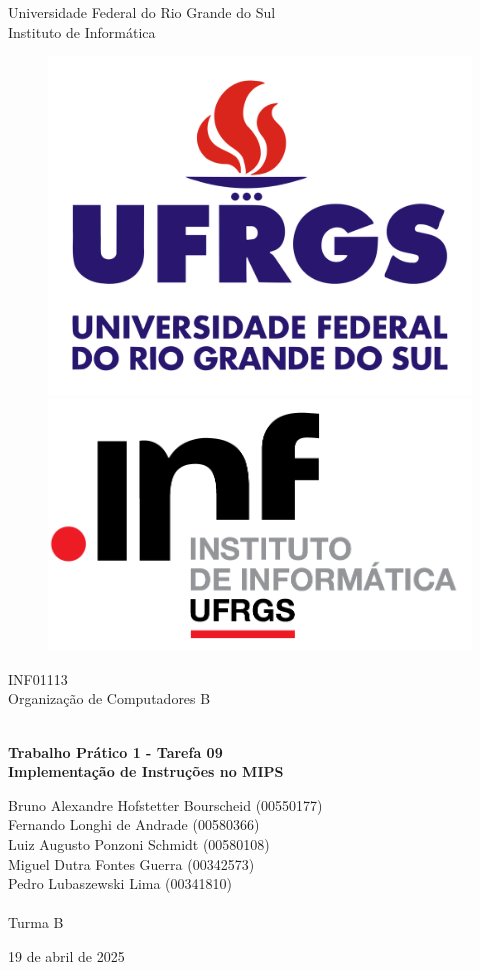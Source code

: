 \documentclass{report}
\begin{document}
    \begin{titlepage}
        \centering
        
        \LARGE {Universidade Federal do Rio Grande do Sul \\ Instituto de Informática}
    
        \begin{figure}[h!]
            \centering
            \subfigure
            {\includegraphics[width=0.35\linewidth]{images/logos/UFRGS.png}}
            \hspace{1cm}
            \subfigure
            {\includegraphics[width=0.35\linewidth]{images/logos/INF.png}}
        \end{figure}
    
        \LARGE {INF01113 \\ Organização de Computadores B}
        
        \vfill
        {\noindent\hrulefill \\
        \bfseries \Huge{Trabalho Prático 1 - Tarefa 09} \\ \LARGE{Implementação de Instruções no MIPS} \\
        \noindent\hrulefill}
        
        \vfill
        {\LARGE Bruno Alexandre Hofstetter Bourscheid (00550177) \\ Fernando Longhi de Andrade (00580366) \\ Luiz Augusto Ponzoni Schmidt (00580108) \\ Miguel Dutra Fontes Guerra (00342573) \\ Pedro Lubaszewski Lima (00341810) \\~\\ Turma B}
    
        \vfill
        {\LARGE 19 de abril de 2025}
        
    \end{titlepage}
\end{document}
